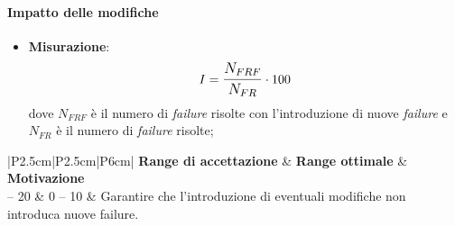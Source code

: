 \paragraph{Impatto delle modifiche}

\begin{itemize}
	\item \textbf{Misurazione}: 
		$$I=\mathlarger{\frac{N_{FRF}}{N_{FR}}} \cdot 100$$
	dove $N_{FRF}$ è il numero di \textit{failure} risolte con l'introduzione di nuove \textit{failure} e $N_{FR}$ è il numero di \textit{failure} risolte;
\end{itemize}

\begin{center}
		\begin{tabular}{|P{2.5cm}|P{2.5cm}|P{6cm}|}
		\hline
			\textbf{Range di accettazione}	& \textbf{Range ottimale} & \textbf{Motivazione} \\
			 -- 20 & 0 -- 10 &	Garantire che l'introduzione di eventuali modifiche non introduca nuove failure. \\
			\hline
			\end{tabular}
\end{center}

